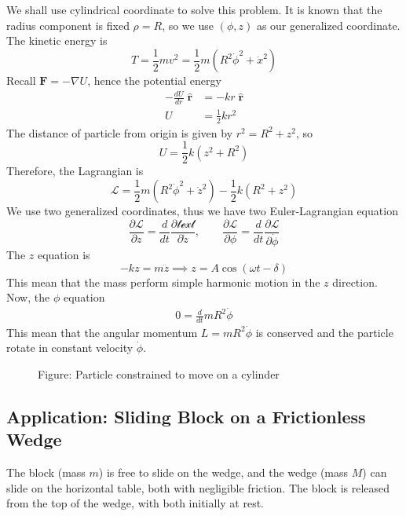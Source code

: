 \documentclass[../../../main.tex]{subfiles}
\begin{document}
We shall use cylindrical coordinate to solve this problem.
It is known that the radius component is fixed $\rho=R$, so we use $(\phi, z)$ as our generalized coordinate.
The kinetic energy is
\begin{equation*}
	T=\frac{1}{2}mv^2=\frac{1}{2}m(R^2\dot{\phi}^2+\dot{x}^2)
\end{equation*}
Recall $\mathbf{F}=-\nabla U$, hence the potential energy
\begin{align*}
	-\frac{dU}{dr}\;\mathbf{\hat{r}} & =-kr\;\mathbf{\hat{r}} \\
	U                                & =\frac{1}{2}kr^2
\end{align*}
The distance of particle from origin is given by $r^2=R^2+z^2$, so
\begin{equation*}
	U=\frac{1}{2}k(z^2+R^2)
\end{equation*}
Therefore, the Lagrangian is
\begin{equation*}
	\mathcal{L}=\frac{1}{2}m(R^2\dot{\phi}^2+\dot{z}^2)-\frac{1}{2}k(R^2+z^2)
\end{equation*}
We use two generalized coordinates, thus we have two Euler-Lagrangian equation
\begin{equation*}
	\frac{\partial \mathcal{L}}{\partial z}=\frac{d}{dt}\frac{\partial \mathcal{text}}{\partial \dot{z}},\qquad\frac{\partial\mathcal{L}}{\partial \phi}=\frac{d}{dt}\frac{\partial\mathcal{L}}{\partial \dot{\phi}}
\end{equation*}
The $z$ equation is
\begin{equation*}
	-kz=m\ddot{z}\implies z=A\cos(\omega t-\delta)
\end{equation*}
This mean that the mass perform simple harmonic motion in the $z$ direction.
Now, the $\phi$ equation
\begin{align*}
	0=\frac{d}{dt}mR^2\dot{\phi}
\end{align*}
This mean that the angular momentum $L=mR^2\dot{\phi}$ is conserved and the particle rotate in constant velocity $\dot{\phi}$.

\begin{figure*}
	\centering
	\caption*{Figure: Particle constrained to move on a cylinder}
\end{figure*}

\subsection*{Application: Sliding Block on a Frictionless Wedge}
The block (mass $m$) is free to slide on the wedge, and the wedge (mass $M$) can slide on the horizontal table, both with negligible friction.
The block is released from the top of the wedge, with both initially at rest.
\end{document}
